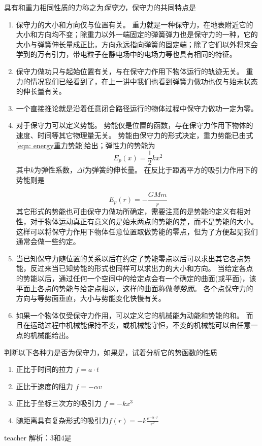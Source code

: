 具有和重力相同性质的力称之为\emph{保守力}，保守力的共同特点是
\begin{enumerate}
\item
保守力的大小和方向仅与位置有关。
重力就是一种保守力，在地表附近它的大小和方向均不变；除重力以外一端固定的弹簧弹力也是保守力的一种，它的大小与弹簧伸长量成正比，方向永远指向弹簧的固定端；除了它们以外将来会学到的万有引力，带电粒子在静电场中的电场力等也具有相同的特征。
\item 
保守力做功只与起始位置有关，与在保守力作用下物体运行的轨迹无关。
重力的情况我们已经看到了，在上一讲中我们也看到弹簧力做功也仅与始末状态的伸长量有关。
\item 一个直接推论就是沿着任意闭合路径运行的物体过程中保守力做功一定为零。
\item 对于保守力可以定义势能。
势能仅是位置的函数，与在保守力作用下物体的速度、时间等其它物理量无关。
势能由保守力的形式决定，重力势能已由式\ref{eqn: energy重力势能}给出；弹性力的势能为
\begin{equation}
E_p(x) = \frac{1}{2}kx^2
\end{equation}
其中$k$为弹性系数，$\Delta l$为弹簧的伸长量。
在反比于距离平方的吸引力作用下的势能则是

\begin{equation}
E_p(r) = -\frac{GMm}{r}
\end{equation}
其它形式的势能也可由保守力做功所确定，需要注意的是势能的定义有相对性，对于物体运动真正有意义的是始末两点的势能的差，而不是势能的大小。
这样可以将保守力作用下物体任意位置取做势能的零点，但为了方便起见我们通常会做一些约定。
\item 当已知保守力随位置的关系以后在约定了势能零点以后可以求出其它各点势能，反过来当已知势能的形式也同样可以求出力的大小和方向。
当给定各点的势能以后，通过任何一个空间中的给定点会有一个确定的曲面(或平面)，该平面上各点的势能与给定点相以，这样的曲面称做\emph{等势面}。
各个点保守力的方向与等势面垂直，大小与势能变化快慢有关。
\item 如果一个物体仅受保守力作用，可以定义它的机械能为动能和势能的和。
而且在运动过程中机械能保持不变，或机械能守恒，不变的机械能可以由任意一点的机械能给出。
\end{enumerate}



\begin{example}
	判断以下各种力是否为保守力，如果是，试着分析它的势函数的性质
	\begin{enumerate}
		\item
		正比于时间的拉力 $f=a\cdot t$
		\item  正比于速度的阻力 $f = -\alpha v$
		\item  正比于坐标三次方的吸引力 $f = - k x^3$
		\item  随距离具有复杂形式的吸引力$f(r) = -k\frac{e^{-\alpha\cdot r} }{r^2}$ 
	\end{enumerate}
	\begin{taggedblock}{teacher}
		\noindent
		解析：3和4是
	\end{taggedblock}
\end{example}



